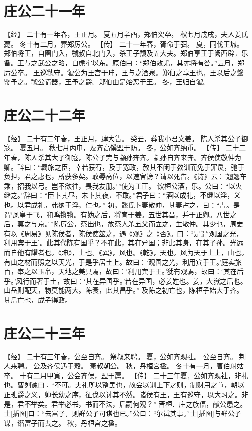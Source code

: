 \documentclass[a4paper,12pt,UTF8,twoside]{ctexbook}
\begin{document}
\chapter{庄公二十一年}

【经】
二十有一年春，王正月。
夏五月辛酉，郑伯突卒。
秋七月戊戌，夫人姜氏薨。
冬十有二月，葬郑厉公。
【传】
二十一年春，胥命于弭。
夏，同伐王城。郑伯将王，自圉门入，虢叔自北门入，杀王子颓及五大夫。郑伯享王于阙西辟，乐备。王与之武公之略，自虎牢以东。原伯曰：“郑伯效尤，其亦将有咎。”五月，郑厉公卒。
王巡虢守。虢公为王宫于玤，王与之酒泉。郑伯之享王也，王以后之鞶鉴予之。虢公请器，王予之爵。郑伯由是始恶于王。
冬，王归自虢。

\chapter{庄公二十二年}

【经】
二十有二年春，王正月，肆大眚。
癸丑，葬我小君文姜。
陈人杀其公子御寇。
夏五月。
秋七月丙申，及齐高傒盟于防。
冬，公如齐纳币。
【传】
二十二年春，陈人杀其大子御寇，陈公子完与颛孙奔齐。颛孙自齐来奔。齐侯使敬仲为卿。辞曰：“羇旅之臣，幸若获宥，及于宽政，赦其不闲于教训而免于罪戾，弛于负担，君之惠也，所获多矣。敢辱高位，以速官谤？请以死告。《诗》云：‘翘翘车乘，招我以弓。岂不欲往，畏我友朋。’”使为工正。
饮桓公酒，乐。公曰：“以火继之。”辞曰：“臣卜其昼，未卜其夜，不敢。”君子曰：“酒以成礼，不继以淫，义也。以君成礼，弗纳于淫，仁也。”
初，懿氏卜妻敬仲，其妻占之，曰：“吉。是谓‘凤皇于飞，和鸣锵锵。有妫之后，将育于姜。五世其昌，并于正卿。八世之后，莫之与京。’”陈厉公，蔡出也，故蔡人杀五父而立之，生敬仲。其少也，周史有以《周易》见陈侯者，陈侯使筮之，遇《观》之《否》。曰：“是谓‘观国之光，利用宾于王’。此其代陈有国乎？不在此，其在异国；非此其身，在其子孙。光远而自他有耀者也。《坤》，土也。《巽》，风也。《乾》，天也。风为天于土上，山也。有山之材而照之以天光，于是乎居土上。故曰：‘观国之光，利用宾于王。’庭实旅百，奉之以玉帛，天地之美具焉，故曰：‘利用宾于王。’犹有观焉，故曰：‘其在后乎。’风行而著于土，故曰：‘其在异国乎。’若在异国，必姜姓也。姜，大嶽之后也。山岳则配天，物莫能两大。陈衰，此其昌乎。”
及陈之初亡也，陈桓子始大于齐。其后亡也，成子得政。

\chapter{庄公二十三年}

【经】
二十有三年春，公至自齐。
祭叔来聘。
夏，公如齐观社。
公至自齐。
荆人来聘。
公及齐侯遇于穀。
萧叔朝公。
秋，丹桓宫楹。
冬十有一月，曹伯射姑卒。
十有二月甲寅，公会齐侯，盟于扈。
【传】
二十三年夏，公如齐观社，非礼也。曹刿谏曰：“不可。夫礼所以整民也，故会以训上下之则，制财用之节，朝以正班爵之义，帅长幼之序，征伐以讨其不然。诸侯有王，王有巡守，以大习之。非是，君不举矣。君举必书，书而不法，后嗣何观？”
晋桓、庄之族偪，献公患之。士[插图]曰：“去富子，则群公子可谋也已。”公曰：“尔试其事。”士[插图]与群公子谋，谮富子而去之。
秋，丹桓宫之楹。
\end{document}
